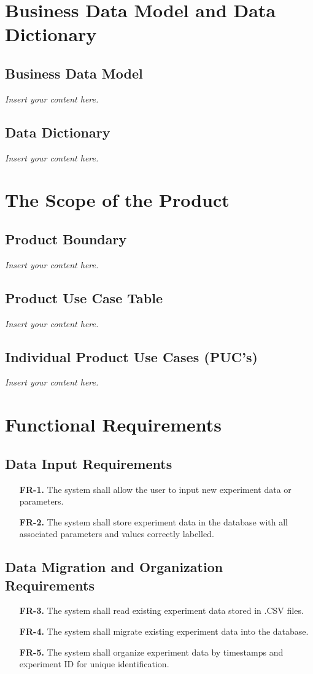 \documentclass[12pt]{article}
\newcommand{\lips}{\textit{Insert your content here.}}
\begin{document}
\section{Business Data Model and Data Dictionary}
\subsection{Business Data Model}
\lips
\subsection{Data Dictionary}
\lips

\section{The Scope of the Product}
\subsection{Product Boundary}
\lips
\subsection{Product Use Case Table}
\lips
\subsection{Individual Product Use Cases (PUC's)}
\lips

\section{Functional Requirements}
\subsection{Data Input Requirements}
  \begin{enumerate}
    \item[\textbf{FR-1.}] The system shall allow the user to input new experiment data or parameters.
    \item[\textbf{FR-2.}] The system shall store experiment data in the database with all associated parameters and values correctly labelled.
  \end{enumerate}

\subsection{Data Migration and Organization Requirements}
  \begin{enumerate}
    \item[\textbf{FR-3.}] The system shall read existing experiment data stored in .CSV files.
    \item[\textbf{FR-4.}] The system shall migrate existing experiment data into the database.
    \item[\textbf{FR-5.}] The system shall organize experiment data by timestamps and experiment ID for unique identification.
  \end{enumerate}
\end{document}
